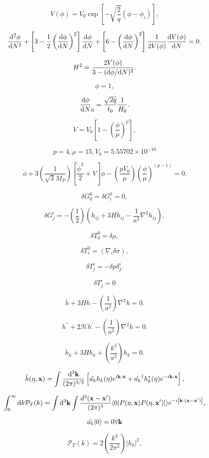 \documentclass[xcolor=dvipsnames]{beamer}
\begin{document}
\begin{frame}

\[ V(\phi) = V_0 \exp\left[-\sqrt{\frac{2}{q}}\left(\phi - \phi_i\right)\right], \]

\[ \frac{{\rm d}^2\phi}{{\rm d}N^2} + \left[3 - \frac{1}{2}\left(\frac{{\rm d}\phi}{{\rm d}N}\right)^2\right]\frac{{\rm d}\phi}{{\rm d}N} + \left[6 - \left(\frac{{\rm d}\phi}{{\rm d}N}\right)^2\right]\frac{1}{2V(\phi)}\frac{{\rm d}V(\phi)}{{\rm d}N} = 0. \]

\[ H^2 = \frac{2V(\phi)}{3-({\rm d}\phi/{\rm d}N)^2}. \]

\[ \phi = 1, \]

\[ \frac{{\rm d}\phi}{{\rm d}N}_0 = \frac{\sqrt{2q}}{t_0}\frac{1}{H_0}. \]

\end{frame}

\begin{frame}

\[ V = V_0\left[1 - \left(\frac{\phi}{\mu}\right)^p\right], \]

\[p = 4, \mu = 15, V_0 = 5.55702\times10^{-10}\]

\[ \ddot{\phi} + 3\left(\frac{1}{\sqrt{3}M_P}\right)\left[\frac{\dot{\phi}^2}{2} + V\right]\dot{\phi} - \left(\frac{pV_0}{\mu}\right)\left(\frac{\phi}{\mu}\right)^{(p-1)} = 0. \]

\end{frame}

\begin{frame}

\[ \delta G^0_0 = \delta G^0_i = 0, \]

\[ \delta G^i_j = -\left(\frac{1}{2}\right)\left(\ddot{h}_{ij} + 3H\dot{h}_{ij} - \frac{1}{a^2}\nabla ^2h_{ij}\right), \]

\[ \delta T^0_0 = \delta\rho, \]

\[ \delta T^0_i = \left(\nabla_i\delta\sigma\right), \]

\[ \delta T^i_j = -\delta p\delta^i_j. \]

\[\delta T^i_j = 0\]

\[ \ddot{h} + 3H\dot{h} - \left(\frac{1}{a^2}\right)\nabla ^2h = 0. \]

\[ {h}^{''} + 2{\mathcal{H}}{h}^{'} - \left(\frac{1}{a^2}\right)\nabla ^2h = 0. \]

\[ \ddot{h}_k + 3H\dot{h}_k + \left(\frac{k^2}{a^2}\right)h_k = 0. \]

\end{frame}

\begin{frame}

\[
\hat{h}(\eta, {\bf x}) = \int \frac{{\rm d}^3\bf{k}}{(2\pi)^{3/2}} \left[\hat{a_k}h_k(\eta)e^{i\bf{k\cdot x}}+ \hat{a_k}^{\dagger}h_k^{*}(\eta)e^{-i\bf{k\cdot x}}\right] ,
\]

\[
\int^{\infty}_0 {\rm d}k {\mathcal{P}}_T(k) = \int {\rm d}^3{\bf{k}}\int\frac{d^3(\bf{x}-\bf{x'})}{(2\pi)^3}\langle 0|P(\eta,{\bf{x}})P(\eta, {\bf{x'}})|\rangle e^{-i{\bf{\left[k \cdot (x-x')\right]}}},
\]

\[\hat{a_k}|0\rangle = 0 \forall {\bf{k}}\]

\[ {\mathcal{P}}_T(k) = 2 \left(\frac{k^3}{2\pi^2}\right) |h_k|^2, \]
\end{frame}
\end{document}

